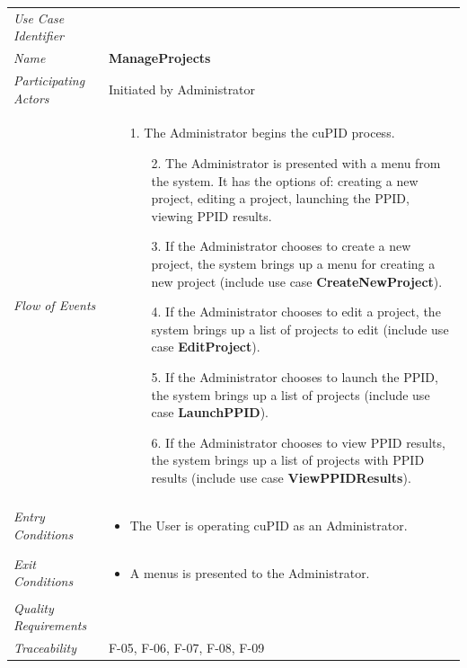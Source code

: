 \documentclass[12pt,letterpaper]{article}
\begin{document}
\begin{center}
    \begin{tabu} to 
        \toprule
		Use Case Identifier & \manageprojects{} \\
		Name & {\bf ManageProjects} \\
        Participating Actors & Initiated by Administrator \\
		Flow of Events & 
		\begin{minipage}[t]{\linewidth}
		    \begin{enumerate}
			    \item[1.] The Administrator begins the cuPID process.
				\begin{enumerate}
					\item[2.] The Administrator is presented with a menu from the system. It has the options of: creating a new project, editing a project, launching the PPID, viewing PPID results.
					\item[3.] If the Administrator chooses to create a new project, the system brings up a menu for creating a new project (include use case \textbf{CreateNewProject}).
					\item[4.] If the Administrator chooses to edit a project, the system brings up a list of projects to edit (include use case \textbf{EditProject}).
					\item[5.] If the Administrator chooses to launch the PPID, the system brings up a list of projects (include use case \textbf{LaunchPPID}).
					\item[6.] If the Administrator chooses to view PPID results, the system brings up a list of projects with PPID results (include use case \textbf{ViewPPIDResults}).
				\end{enumerate}
			\end{enumerate}
	    \end{minipage} \\

		Entry Conditions &
		\begin{minipage}[t]{\linewidth}
			\begin{itemize}
			    \item The User is operating cuPID as an Administrator.
	        \end{itemize}
	    \end{minipage} \\

		Exit Conditions &
		\begin{minipage}[t]{\linewidth}
			\begin{itemize}
			    \item A menus is presented to the Administrator.
	        \end{itemize}
		\end{minipage} \\

		Quality Requirements & \\

		Traceability & F-05, F-06, F-07, F-08, F-09\\
        \toprule
    \end{tabu}
\end{center}
\end{document}
